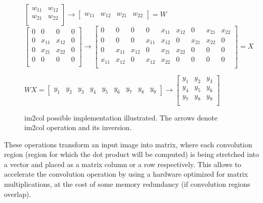 \documentclass[thesis=B,english]{FITthesis}[2019/12/23]
\begin{document}
	\begin{figure}[h]
		\centering
		
		$\begin{bmatrix}
		w_{11} & w_{12}\\
		w_{21} & w_{22}\\
		\end{bmatrix} \longrightarrow \begin{bmatrix}
		w_{11} & w_{12} & w_{21} & w_{22} 
		\end{bmatrix} = W$
		$\begin{bmatrix}
		0 & 0 & 0 & 0\\
		0 & x_{11} & x_{12} & 0\\
		0 & x_{21} & x_{22} & 0\\
		0 & 0 & 0 & 0\\
		
	\end{bmatrix} \longrightarrow \begin{bmatrix}
		0      & 0      & 0         & 0         & x_{11}    & x_{12} & 0    & x_{21} & x_{22}\\
		0      & 0      & 0         & x_{11}    & x_{12}    & 0      & x_{21} & x_{22} & 0\\
		0      & x_{11} & x_{12}    & 0         & x_{21}    & x_{22} & 0    & 0   & 0\\
		x_{11} & x_{12} & 0         & x_{12}    & x_{22}    & 0      & 0    & 0   & 0\\
	\end{bmatrix} = X$
	
	$WX = \begin{bmatrix} y_1 & y_2 & y_3 & y_4 & y_5 & y_6 & y_7 & y_8 & y_9 \end{bmatrix} \longrightarrow \begin{bmatrix}
	y_1 & y_2 & y_3\\
	y_4 & y_5 & y_6\\
	y_7 & y_8 & y_9\\
	\end{bmatrix}$
	
	\caption{im2col possible implementation illustrated. The arrows denote im2col operation and its inversion.}
\end{figure}

These operations transform an input image into matrix, where each convolution region (region for which the dot product will be computed) is being stretched into a vector and placed as a matrix column or a row respectively. This allows to accelerate the convolution operation by using a hardware optimized for matrix multiplications, at the cost of some memory redundancy (if convolution regions overlap).
\end{document}
